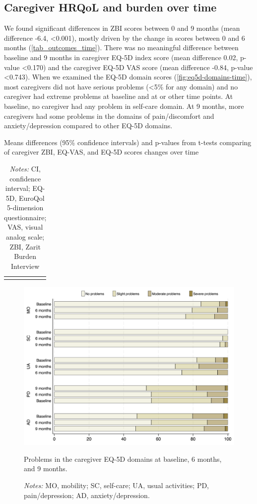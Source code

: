 \documentclass[12pt]{article}
\begin{document}
\subsection*{Caregiver HRQoL and burden over time}
We found significant differences in ZBI scores between 0 and 9  months (mean difference -6.4, <0.001), mostly driven by the change in scores between 0 and 6 months (\autoref{tab_outcomes_time}). There was no meaningful difference between baseline and 9 months in caregiver EQ-5D index score (mean difference 0.02, p-value <0.170) and the caregiver EQ-5D VAS score (mean difference -0.84, p-value <0.743). When we examined the EQ-5D domain scores (\autoref{fig:eq5d-domains-time}), most caregivers did not have serious problems (<5\% for any domain) and no caregiver had extreme problems at baseline and at or other time points. At baseline, no caregiver had any problem in self-care domain. At 9 months, more caregivers had some problems in the domains of pain/discomfort and anxiety/depression compared to other EQ-5D domains.

\begin{table}[H]
    \centering \singlespacing \small
    \caption{Means differences (95\% confidence intervals) and p-values from t-tests comparing of caregiver ZBI, EQ-VAS, and EQ-5D scores changes over time}
    \begin{tabular}{|L{6cm}|C{5cm}|C{2.5cm}|}
        \hline
    \end{tabular}
    \label{tab_outcomes_time}
    \caption*{\footnotesize 
                \textit{Notes:} CI, confidence interval; EQ-5D, EuroQol 5-dimension questionnaire; VAS, visual analog scale; ZBI, Zarit Burden Interview}
\end{table}

\begin{figure}[H]
    \centering
    \includegraphics[width=1\linewidth]{figures/eq5d-domains-time.png}
    \caption{Problems in the caregiver EQ-5D domains at baseline, 6 months, and 9 months.}
    \label{fig:eq5d-domains-time}
    \caption*{\footnotesize \textit{Notes:} MO, mobility; SC, self-care; UA, usual activities; PD, pain/depression; AD, anxiety/depression.}
\end{figure}
\end{document}
